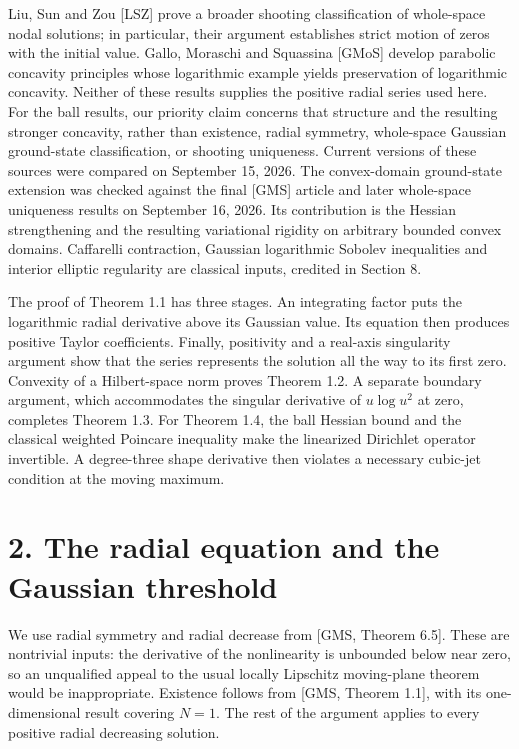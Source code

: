\documentclass[11pt]{article}
\begin{document}
Liu, Sun and Zou {[}LSZ{]} prove a broader shooting classification of
whole-space nodal solutions; in particular, their argument establishes
strict motion of zeros with the initial value. Gallo, Moraschi and
Squassina {[}GMoS{]} develop parabolic concavity principles whose
logarithmic example yields preservation of logarithmic concavity.
Neither of these results supplies the positive radial series used here.
For the ball results, our priority claim concerns that structure and the
resulting stronger concavity, rather than existence, radial symmetry,
whole-space Gaussian ground-state classification, or shooting
uniqueness. Current versions of these sources were compared on September
15, 2026. The convex-domain ground-state extension was checked against
the final {[}GMS{]} article and later whole-space uniqueness results on
September 16, 2026. Its contribution is the Hessian strengthening and
the resulting variational rigidity on arbitrary bounded convex domains.
Caffarelli contraction, Gaussian logarithmic Sobolev inequalities and
interior elliptic regularity are classical inputs, credited in Section
8.

The proof of Theorem 1.1 has three stages. An integrating factor puts
the logarithmic radial derivative above its Gaussian value. Its equation
then produces positive Taylor coefficients. Finally, positivity and a
real-axis singularity argument show that the series represents the
solution all the way to its first zero. Convexity of a Hilbert-space
norm proves Theorem 1.2. A separate boundary argument, which
accommodates the singular derivative of \(u\log u^2\) at zero, completes
Theorem 1.3. For Theorem 1.4, the ball Hessian bound and the classical
weighted Poincare inequality make the linearized Dirichlet operator
invertible. A degree-three shape derivative then violates a necessary
cubic-jet condition at the moving maximum.

\section{2. The radial equation and the Gaussian
threshold}\label{the-radial-equation-and-the-gaussian-threshold}

We use radial symmetry and radial decrease from {[}GMS, Theorem 6.5{]}.
These are nontrivial inputs: the derivative of the nonlinearity is
unbounded below near zero, so an unqualified appeal to the usual locally
Lipschitz moving-plane theorem would be inappropriate. Existence follows
from {[}GMS, Theorem 1.1{]}, with its one-dimensional result covering
\(N=1\). The rest of the argument applies to every positive radial
decreasing solution.
\end{document}
